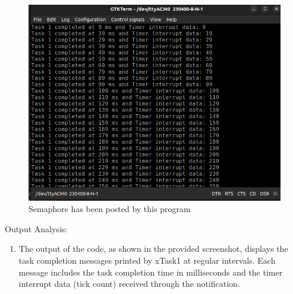 \documentclass[a4paper,11pt]{article}%
\newenvironment{qanda}{\setlength{\parindent}{0pt}}{\bigskip}
\begin{document}
\begin{qanda}
	\begin{figure}[!h]
		\centering
		\includegraphics[scale=0.6]{figures/q1.png}
		\caption{Semaphore has been posted by this program}

	\end{figure}


	Output Analysis:
	\begin{enumerate}
		\item The output of the code, as shown in the provided screenshot, displays the task completion messages printed by xTask1 at regular intervals. Each message includes the task completion time in milliseconds and the timer interrupt data (tick count) received through the notification.
		
	\end{enumerate}
	

\end{qanda}
\end{document}
